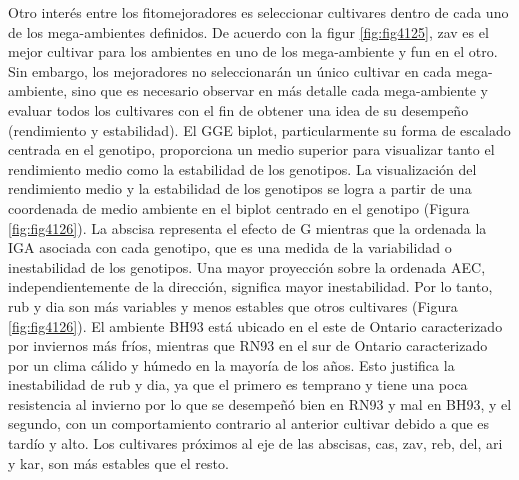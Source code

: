 Otro interés entre los fitomejoradores es seleccionar cultivares dentro de cada uno de los mega-ambientes definidos. De acuerdo con la figur  \ref{fig:fig4125}, zav es el mejor cultivar para los ambientes en uno de los mega-ambiente y fun en el otro. Sin embargo, los mejoradores no seleccionarán un único cultivar en cada mega-ambiente, sino que es necesario observar en más detalle cada mega-ambiente y evaluar todos los cultivares con el fin de obtener una idea de su desempeño (rendimiento y estabilidad).
El GGE biplot, particularmente su forma de escalado centrada en el genotipo, proporciona un medio superior para visualizar tanto el rendimiento medio como la estabilidad de los genotipos. La visualización del rendimiento medio y la estabilidad de los genotipos se logra a partir de una coordenada de medio ambiente en el biplot centrado en el genotipo (Figura \ref{fig:fig4126}). La abscisa representa el efecto de G mientras que la ordenada la IGA asociada con cada genotipo, que es una medida de la variabilidad o inestabilidad de los genotipos. Una mayor proyección sobre la ordenada AEC, independientemente de la dirección, significa mayor inestabilidad. Por lo tanto, rub y dia son más variables y menos estables que otros cultivares (Figura \ref{fig:fig4126}). El ambiente BH93 está ubicado en el este de Ontario caracterizado por inviernos más fríos, mientras que RN93 en el sur de Ontario caracterizado por un clima cálido y húmedo en la mayoría de los años. Esto justifica la inestabilidad de rub y dia, ya que el primero es temprano y tiene una poca resistencia al invierno por lo que se desempeñó bien en RN93 y mal en BH93, y el segundo, con un comportamiento contrario al anterior cultivar debido a que es tardío y alto. Los cultivares próximos al eje de las abscisas, cas, zav, reb, del, ari y kar, son más estables que el resto. 


